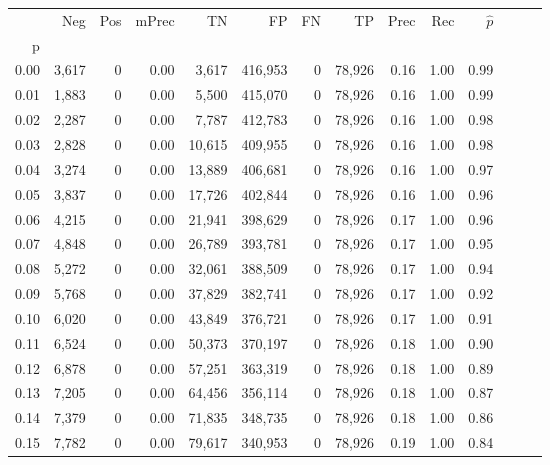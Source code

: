 \begin{tabular}{rrrrrrrrrrrrrr}
\toprule
{} &    Neg &    Pos & mPrec &       TN &       FP &      FN &      TP &  Prec &   Rec & $\hat{p}$ \\
p    &        &        &       &          &          &         &         &       &       &           \\
\midrule
0.00 &  3,617 &      0 &  0.00 &    3,617 &  416,953 &       0 &  78,926 &  0.16 &  1.00 &      0.99 \\
0.01 &  1,883 &      0 &  0.00 &    5,500 &  415,070 &       0 &  78,926 &  0.16 &  1.00 &      0.99 \\
0.02 &  2,287 &      0 &  0.00 &    7,787 &  412,783 &       0 &  78,926 &  0.16 &  1.00 &      0.98 \\
0.03 &  2,828 &      0 &  0.00 &   10,615 &  409,955 &       0 &  78,926 &  0.16 &  1.00 &      0.98 \\
0.04 &  3,274 &      0 &  0.00 &   13,889 &  406,681 &       0 &  78,926 &  0.16 &  1.00 &      0.97 \\
0.05 &  3,837 &      0 &  0.00 &   17,726 &  402,844 &       0 &  78,926 &  0.16 &  1.00 &      0.96 \\
0.06 &  4,215 &      0 &  0.00 &   21,941 &  398,629 &       0 &  78,926 &  0.17 &  1.00 &      0.96 \\
0.07 &  4,848 &      0 &  0.00 &   26,789 &  393,781 &       0 &  78,926 &  0.17 &  1.00 &      0.95 \\
0.08 &  5,272 &      0 &  0.00 &   32,061 &  388,509 &       0 &  78,926 &  0.17 &  1.00 &      0.94 \\
0.09 &  5,768 &      0 &  0.00 &   37,829 &  382,741 &       0 &  78,926 &  0.17 &  1.00 &      0.92 \\
0.10 &  6,020 &      0 &  0.00 &   43,849 &  376,721 &       0 &  78,926 &  0.17 &  1.00 &      0.91 \\
0.11 &  6,524 &      0 &  0.00 &   50,373 &  370,197 &       0 &  78,926 &  0.18 &  1.00 &      0.90 \\
0.12 &  6,878 &      0 &  0.00 &   57,251 &  363,319 &       0 &  78,926 &  0.18 &  1.00 &      0.89 \\
0.13 &  7,205 &      0 &  0.00 &   64,456 &  356,114 &       0 &  78,926 &  0.18 &  1.00 &      0.87 \\
0.14 &  7,379 &      0 &  0.00 &   71,835 &  348,735 &       0 &  78,926 &  0.18 &  1.00 &      0.86 \\
0.15 &  7,782 &      0 &  0.00 &   79,617 &  340,953 &       0 &  78,926 &  0.19 &  1.00 &      0.84 \\

\end{tabular}
